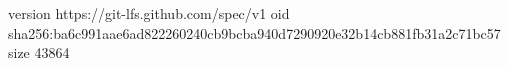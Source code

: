 version https://git-lfs.github.com/spec/v1
oid sha256:ba6c991aae6ad822260240cb9bcba940d7290920e32b14cb881fb31a2c71bc57
size 43864
